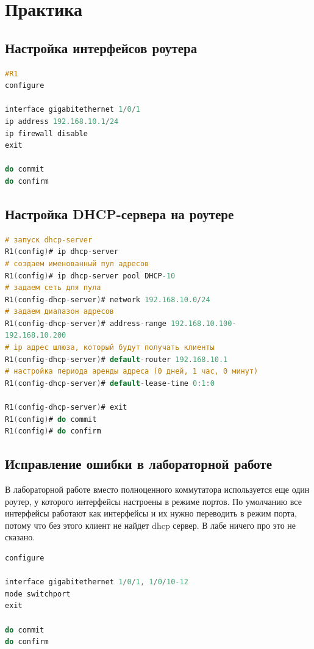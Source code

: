\chapter{Практика}


\section{Настройка интерфейсов роутера}

\begin{lstlisting}[language=C, caption={Пример настройки интерфейсов роутера}]
#R1
configure

interface gigabitethernet 1/0/1
ip address 192.168.10.1/24
ip firewall disable
exit

do commit
do confirm
\end{lstlisting}

\section{Настройка DHCP-сервера на роутере}

\begin{lstlisting}[language=C, caption={Пример настройки DHCP-сервера}]
# запуск dhcp-server
R1(config)# ip dhcp-server
# создаем именованный пул адресов
R1(config)# ip dhcp-server pool DHCP-10
# задаем сеть для пула
R1(config-dhcp-server)# network 192.168.10.0/24
# задаем диапазон адресов
R1(config-dhcp-server)# address-range 192.168.10.100-
192.168.10.200
# ip адрес шлюза, который будут получать клиенты
R1(config-dhcp-server)# default-router 192.168.10.1
# настройка периода аренды адреса (0 дней, 1 час, 0 минут)
R1(config-dhcp-server)# default-lease-time 0:1:0

R1(config-dhcp-server)# exit
R1(config)# do commit
R1(config)# do confirm
\end{lstlisting}

\section{Исправление ошибки в лабораторной работе}
В лабораторной работе вместо полноценного коммутатора используется еще один роутер, у которого интерфейсы настроены в режиме портов.
По умолчанию все интерфейсы работают как интерфейсы и их нужно переводить в режим порта, потому что без этого клиент не найдет dhcp сервер.
В лабе ничего про это не сказано.

\begin{lstlisting}[language=C, caption={Пример перевода интерфейса в режим порта}]
configure

interface gigabitethernet 1/0/1, 1/0/10-12
mode switchport
exit

do commit
do confirm
\end{lstlisting}


